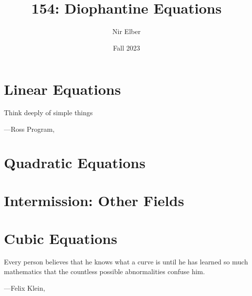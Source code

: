 \documentclass[openany]{book}
\title{154: Diophantine Equations}
\author{Nir Elber}
\date{Fall 2023}
\begin{document}
\maketitle

\nirtableofcontents

\newpage

\chapter{Linear Equations}

\epigraph{Think deeply of simple things}
{---Ross Program, \cite{ross-program}}






\chapter{Quadratic Equations}





\chapter{Intermission: Other Fields}






\chapter{Cubic Equations}

\epigraph{Every person believes that he knows what a curve is until he has learned so much mathematics that the countless possible abnormalities confuse him.}
{---Felix Klein, \cite{klein-elem-math-ii}}






\nirprintbib
\nirprintindex
\end{document}
